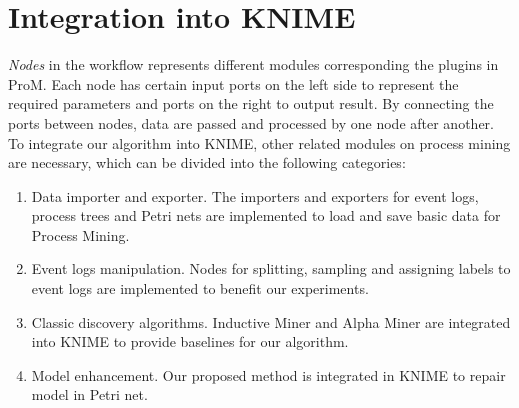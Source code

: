 \section{Integration into KNIME}
\emph{Nodes} in the workflow represents different modules corresponding the plugins in ProM. Each node has certain input ports on the left side to represent the required parameters and  ports on the right to output result. By connecting the ports between nodes, data are passed and processed by one node after another. To integrate our algorithm into KNIME, other related modules on process mining are necessary, which can be divided into the following categories: 
\begin{enumerate}
	\item Data importer and exporter. The importers and exporters for event logs, process trees and Petri nets are implemented to load and save basic data for Process Mining.
	\item Event logs manipulation. Nodes for splitting, sampling and assigning labels to event logs are implemented to benefit our experiments.
	\item Classic discovery algorithms. Inductive Miner and Alpha Miner are integrated into KNIME to provide baselines for our algorithm.
	\item Model enhancement. Our proposed method is integrated in KNIME to repair model in Petri net.
\end{enumerate}


